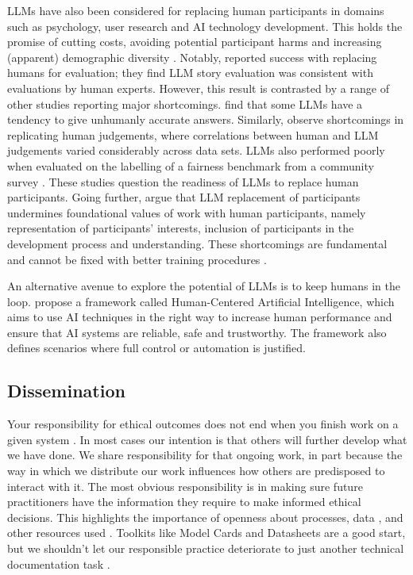 LLMs have also been considered for replacing human participants in domains such as psychology, user research and AI technology development. This holds the promise of cutting costs, avoiding potential participant harms and increasing (apparent) demographic diversity \cite{agnew_illusion_2024}.
Notably, \citet{chiang_can_2023} reported success with replacing humans for evaluation; they find LLM story evaluation was consistent with evaluations by human experts.
However, this result is contrasted by a range of other studies reporting major shortcomings.
\citet{aher_using_2022} find that some LLMs have a tendency to give unhumanly accurate answers. Similarly, \citet{bavaresco_llms_2024} observe shortcomings in replicating human judgements, where correlations between human and LLM judgements varied considerably across data sets.
LLMs also performed poorly when evaluated on the labelling of a fairness benchmark from a community survey \cite{felkner_gpt_2024}.
These studies question the readiness of LLMs to replace human participants. Going further, \citet{agnew_illusion_2024} argue that LLM replacement of participants undermines foundational values of work with human participants, namely representation of participants' interests, inclusion of participants in the development process and understanding. These shortcomings are fundamental and cannot be fixed with better training procedures \cite{agnew_illusion_2024}.

An alternative avenue to explore the potential of LLMs is to keep humans in the loop. \citet{shneiderman_human-centered_2020} propose a framework called Human-Centered Artificial Intelligence, which aims to use AI techniques in the right way to increase human performance and ensure that AI systems are reliable, safe and trustworthy. The framework also defines scenarios where full control or automation is justified.


\subsection{Dissemination}\label{subsec:diss}
Your responsibility for ethical outcomes does not end when you finish work on a given system \citep{widder2023dislocated}. In most cases our intention is that others will further develop what we have done. We share responsibility for that ongoing work, in part because the way in which we distribute our work influences how others are predisposed to interact with it. The most obvious responsibility is in making sure future practitioners have the information they require to make informed ethical decisions. This highlights the importance of openness about processes, data \citep{mieskes_quantitative_2017}, and other resources used \cite{schwartz_green_2019}. Toolkits like Model Cards and Datasheets \citep{mitchell_model_2019, gebru2021datasheets} are a good start, but we shouldn't let our responsible practice deteriorate to just another technical documentation task \citep{widder_epistemic_2024}. 

